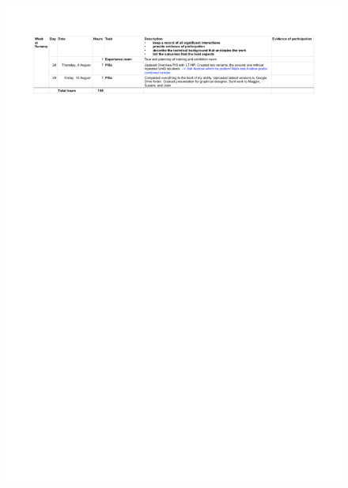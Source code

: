 \begin{figure}
	\centering
	\includegraphics[height=\textheight]{Appendices/Log_04.png}
\end{figure}